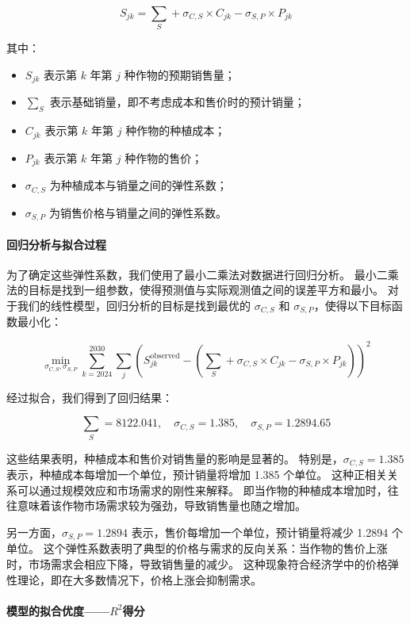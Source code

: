 \documentclass[12pt,a4paper]{nmmcm}
\begin{document}
\[
  S_{jk} = \sum_S + \sigma_{C,S} \times C_{jk} - \sigma_{S,P} \times P_{jk}
\]

其中：
\begin{itemize}
  \item $S_{jk}$ 表示第 $k$ 年第 $j$ 种作物的预期销售量；
  \item $\sum_S$ 表示基础销量，即不考虑成本和售价时的预计销量；
  \item $C_{jk}$ 表示第 $k$ 年第 $j$ 种作物的种植成本；
  \item $P_{jk}$ 表示第 $k$ 年第 $j$ 种作物的售价；
  \item $\sigma_{C,S}$ 为种植成本与销量之间的弹性系数；
  \item $\sigma_{S,P}$ 为销售价格与销量之间的弹性系数。

\end{itemize}

\paragraph{回归分析与拟合过程}

为了确定这些弹性系数，我们使用了最小二乘法对数据进行回归分析。
最小二乘法的目标是找到一组参数，使得预测值与实际观测值之间的误差平方和最小。
对于我们的线性模型，回归分析的目标是找到最优的 $\sigma_{C,S}$ 和 $\sigma_{S,P}$，使得以下目标函数最小化：

\[
  \min_{\sigma_{C,S}, \sigma_{S,P}} \sum_{k=2024}^{2030} \sum_{j} \left( S_{jk}^{\text{observed}} - \left( \sum_S + \sigma_{C,S} \times C_{jk} - \sigma_{S,P} \times P_{jk} \right) \right)^2
\]

经过拟合，我们得到了回归结果：

\[
  \sum_S = 8122.041, \quad \sigma_{C,S} = 1.385, \quad \sigma_{S,P} = 1.2894.65
\]


这些结果表明，种植成本和售价对销售量的影响是显著的。
特别是，$\sigma_{C,S} = 1.385$ 表示，种植成本每增加一个单位，预计销量将增加 1.385 个单位。
这种正相关关系可以通过规模效应和市场需求的刚性来解释。
即当作物的种植成本增加时，往往意味着该作物市场需求较为强劲，导致销售量也随之增加。

另一方面，$\sigma_{S,P} = 1.2894$ 表示，售价每增加一个单位，预计销量将减少 1.2894 个单位。
这个弹性系数表明了典型的价格与需求的反向关系：当作物的售价上涨时，市场需求会相应下降，导致销售量的减少。
这种现象符合经济学中的价格弹性理论，即在大多数情况下，价格上涨会抑制需求。


\paragraph{模型的拟合优度——$R^2$得分}
\end{document}
